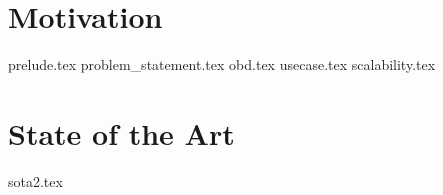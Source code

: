 \chapter{Motivation}\label{cha:motivation}
{prelude.tex}
{problem_statement.tex}
{obd.tex}
{usecase.tex}
{scalability.tex}
\chapter{State of the Art}\label{cha:sota}
{sota2.tex}

